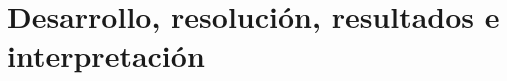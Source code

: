 \chapter{Desarrollo, resolución, resultados e interpretación}


\pagebreak

\pagebreak

\pagebreak

\pagebreak

\pagebreak

